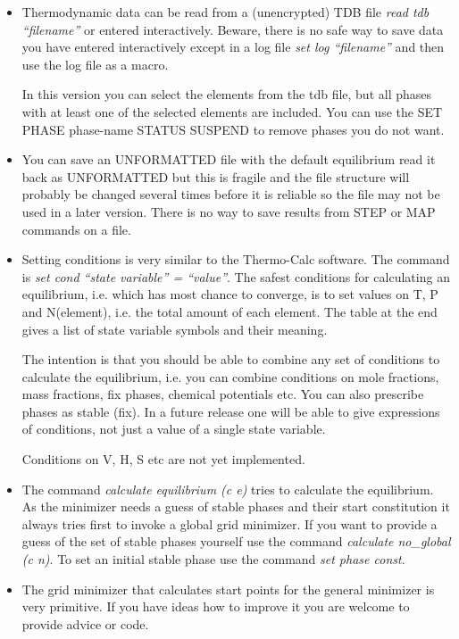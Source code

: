 \documentclass[12pt]{article}
\begin{document}
\begin{itemize}
\item Thermodynamic data can be read from a (unencrypted) TDB file
  {\em read tdb ``filename''} or entered interactively.  Beware, there
  is no safe way to save data you have entered interactively except in
  a log file {\em set log ``filename''} and then use the log file as a
  macro.

  In this version you can select the elements from the tdb file, but
  all phases with at least one of the selected elements are included.
  You can use the SET PHASE phase-name STATUS SUSPEND to remove phases
  you do not want.

\item You can save an UNFORMATTED file with the default equilibrium
  read it back as UNFORMATTED but this is fragile and the file
  structure will probably be changed several times before it is
  reliable so the file may not be used in a later version.  There is
  no way to save results from STEP or MAP commands on a file.

\item Setting conditions is very similar to the Thermo-Calc software.
  The command is {\em set cond ``state variable'' = ``value''}.  The
  safest conditions for calculating an equilibrium, i.e. which has
  most chance to converge, is to set values on T, P and N(element),
  i.e. the total amount of each element.  The table at the end gives a
  list of state variable symbols and their meaning.

  The intention is that you should be able to combine any set of
  conditions to calculate the equilibrium, i.e. you can combine
  conditions on mole fractions, mass fractions, fix phases, chemical
  potentials etc.  You can also prescribe phases as stable (fix).  In
  a future release one will be able to give expressions of conditions,
  not just a value of a single state variable.

  Conditions on V, H, S etc are not yet implemented.

\item The command {\em calculate equilibrium (c e)} tries to calculate
  the equilibrium.  As the minimizer needs a guess of stable phases
  and their start constitution it always tries first to invoke a
  global grid minimizer.  If you want to provide a guess of the set of
  stable phases yourself use the command {\em calculate no\_global (c
    n)}.  To set an initial stable phase use the command {\em set
    phase const}.

\item The grid minimizer that calculates start points for the general
  minimizer is very primitive.  If you have ideas how to improve it
  you are welcome to provide advice or code.


\end{itemize}
\end{document}
